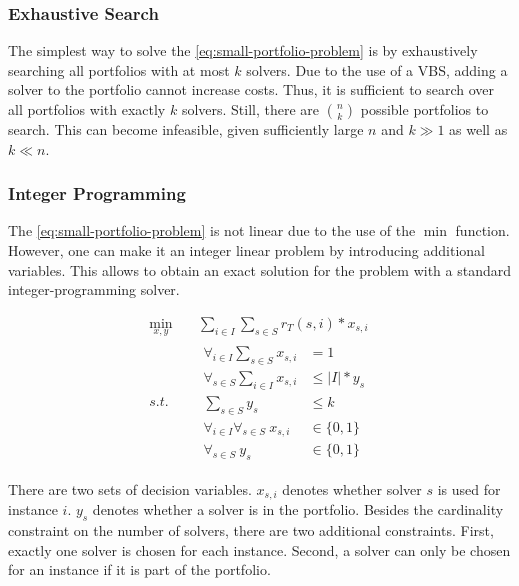 \documentclass[conference]{IEEEtran}
\begin{document}
\subsubsection{Exhaustive Search}

The simplest way to solve the \ref{eq:small-portfolio-problem} is by exhaustively searching all portfolios with at most $k$ solvers.
Due to the use of a VBS, adding a solver to the portfolio cannot increase costs.
Thus, it is sufficient to search over all portfolios with exactly $k$ solvers.
Still, there are $\binom{n}{k}$ possible portfolios to search.
This can become infeasible, given sufficiently large $n$ and $k \gg 1$ as well as $k \ll n$.

\subsubsection{Integer Programming}

The \ref{eq:small-portfolio-problem} is not linear due to the use of the $\min$ function.
However, one can make it an integer linear problem by introducing additional variables.
This allows to obtain an exact solution for the problem with a standard integer-programming solver.

\begin{equation}
	\label{eq:small-portfolio-integer-problem}
	\begin{aligned}
		\min_{x,y} \quad & \sum_{i \in I} \sum_{s \in S} r_T(s,i) * x_{s,i} \\
		s.t. \quad & \begin{aligned}
			\forall_{i\in I} \sum_{s \in S} x_{s,i} &= 1\\
			\forall_{s \in S} \sum_{i \in I} x_{s,i} &\leq |I| * y_s\\
			\sum_{s \in S} y_s &\leq k\\
			\forall_{i\in I} \forall_{s \in S}~x_{s,i} &\in \{0, 1\}\\
			\forall_{s \in S}~y_s &\in \{0,1\}
		\end{aligned}
	\end{aligned}
	\tag{Small-Portfolio Integer Problem}
\end{equation}

There are two sets of decision variables.
$x_{s,i}$ denotes whether solver $s$ is used for instance $i$.
$y_s$ denotes whether a solver is in the portfolio.
Besides the cardinality constraint on the number of solvers, there are two additional constraints.
First, exactly one solver is chosen for each instance.
Second, a solver can only be chosen for an instance if it is part of the portfolio.
\end{document}
